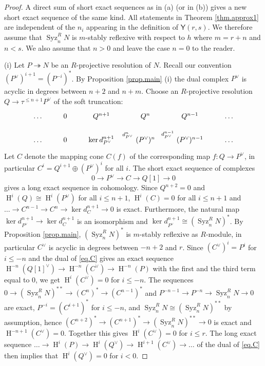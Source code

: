 \documentclass[a4paper,10pt]{amsart}
\theoremstyle{plain}
\theoremstyle{definition}
\theoremstyle{remark}
\numberwithin{equation}{xx}
\DeclareMathOperator{\cH}{H}
\DeclareMathOperator{\Syz}{Syz}
\newcommand{\co}{\colon}
\newcommand{\ra}{\rightarrow}
\newcommand{\lra}{\longrightarrow}
\newcommand{\thr}{\twoheadrightarrow}
\renewcommand{\leq}{\leqslant}
\newcommand{\cat}[1]{\mathsf{{#1}}}
\newcommand{\syz}[2]{{\Syz}_{#2}^{#1}}
\begin{document}
\begin{proof}
A direct sum of short exact sequences as in (a) (or in (b)) gives a new short exact sequence of the same kind. All statements in Theorem \ref{thm.approx1} are independent of the \(n_{i}\) appearing in the definition of \(\cat{Y}(r,s)\). We therefore
assume that \(\syz{R}{n}N\) is \(m\)-stably reflexive with respect to \(h\) where \(m=r+n\) and \(n<s\). We also assume that \(n>0\) and leave the case \(n=0\) to the reader.

(i) Let \(P\thr N\) be an \(R\)-projective resolution of \(N\). Recall our convention \((P^{\vee})^{i+1}=(P^{-i})^{*}\). By Proposition \ref{prop.main} (i) the dual complex \(P^{\vee}\) is acyclic in degrees between \(n+2\) and \(n+m\). Choose an \(R\)-projective resolution \(Q\ra \tau^{\leq n+1}P^{\vee}\) of the soft truncation: 
\begin{equation}
\xymatrix@C-0pt@R-8pt@H-30pt{
\dots & 0\ar[l]\ar[d] & Q^{n+1}\ar[l]\ar[d] & Q^{n}\ar[l]\ar[d] & Q^{n-1}\ar[l]\ar[d] & \dots\ar[l]  \\
\dots & 0\ar[l] & \ker d_{P^{\vee}}^{n+1}\ar[l] & (P^{\vee})^{n}\ar[l]_(0.4){d_{P^{\vee}}^{n}} & (P^{\vee})^{n-1}\ar[l]_{d_{P^{\vee}}^{n-1}} & \dots\ar[l]
}
\end{equation}
Let \(C\) denote the mapping cone \(C(f)\) of the corresponding map \(f\co Q\ra P^{\vee}\), in particular \(C^{i}=Q^{i+1}{\oplus}(P^{\vee})^{i}\) for all \(i\). The short exact sequence of complexes 
\begin{equation}\label{eq.C}
0\ra P^{\vee}\lra C\lra Q[1]\ra0
\end{equation}
gives a long exact sequence in cohomology. Since \(Q^{n+2}=0\) and \(\cH^{i}(Q)\cong\cH^{i}(P^{\vee})\) for all \(i\leq n+1\), \(\cH^{i}(C)=0\) for all \(i\leq n+1\) and \(\dots\ra C^{n-1}\ra C^{n}\ra \ker d_{C}^{n+1}\ra 0\) is exact. Furthermore, the natural map \(\ker d_{P^{\vee}}^{n+1}\ra \ker d_{C}^{n+1}\) is an isomorphism and \(\ker d_{P^{\vee}}^{n+1}\cong (\syz{R}{n}N)^{*}\). By Proposition \ref{prop.main}, \((\syz{R}{n}N)^{*}\) is \(m\)-stably reflexive as \(R\)-module, in particular \(C^{\vee}\) is acyclic in degrees between \(-n+2\) and \(r\). Since \((C^{\vee})^{i}=P^{i}\) for \(i\leq -n\) and the dual of \eqref{eq.C} gives an exact sequence \(\cH^{-n}(Q[1]^{\vee})\ra \cH^{-n}(C^{\vee})\ra \cH^{-n}(P)\) with the first and the third term equal to \(0\), we get \(\cH^{i}(C^{\vee})=0\) for \(i\leq -n\). The sequences \(0\ra (\syz{R}{n}N)^{**}\ra (C^{n})^{*}\ra (C^{n-1})^{*}\) and \(P^{-n-1}\ra P^{-n}\ra \syz{R}{n}N\ra 0\) are exact, \(P^{-i}=(C^{i+1})^{*}\) for \(i\leq -n\), and \(\syz{R}{n}N\cong (\syz{R}{n}N)^{**}\) by assumption, hence \((C^{n+2})^{*}\ra (C^{n+1})^{*}\ra (\syz{R}{n}N)^{**}\ra 0\) is exact and \(\cH^{-n+1}(C^{\vee})=0\). Together this gives \(\cH^{i}(C^{\vee})=0\) for \(i\leq r\). The long exact sequence \(\dots\ra \cH^{i}(P)\ra\cH^{i}(Q^{\vee})\ra\cH^{i+1}(C^{\vee})\ra\dots\) of the dual of \eqref{eq.C} then implies that \(\cH^{i}(Q^{\vee})=0\) for \(i<0\).

\end{proof}
\end{document}

